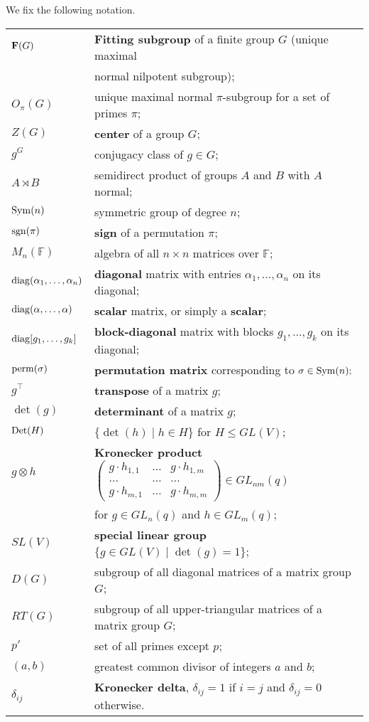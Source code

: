 
We fix the following notation.
\medskip\\
\begin{longtable}{ p{7em} p{27em} }
${\bf F}(G)$ & {\bf Fitting subgroup} \index{Fitting subgroup} of a finite group $G$ (unique maximal \\ & normal  nilpotent subgroup);\\
$O_{\pi}(G)$ & unique maximal normal $\pi$-subgroup for a set of primes $\pi$;\\
$Z(G)$ & {\bf center} of a group $G$;\\
$g^G$ & conjugacy class of $g \in G$;\\
$A \rtimes B$ & semidirect product of groups $A$ and $B$ with $A$ normal;\\
 $\mathrm{Sym}(n)$ &  symmetric group of degree $n$; \\
$\mathrm{sgn}(\pi)$ &  {\bf sign} of a permutation $\pi$;\\
$M_n(\mathbb{F})$& algebra of all $n \times n$ matrices over $\mathbb{F}$;\\
 $\mathrm{diag}(\alpha_1, \ldots, \alpha_n)$ &  {\bf diagonal} matrix with entries $\alpha_1, \ldots, \alpha_n$ on its diagonal;  \\ 
 $\mathrm{diag}(\alpha, \ldots, \alpha)$ &  {\bf scalar} matrix, or simply a {\bf scalar};  \\  
 $\mathrm{diag}[g_1, \ldots, g_k]$ &  {\bf block-diagonal} matrix with blocks $g_1, \ldots, g_k$ on its diagonal;  \\
$\mathrm{perm}(\sigma)$ & {\bf permutation matrix} corresponding to $\sigma \in \mathrm{Sym}(n);$\\
$g^{\top}$ & {\bf transpose} of a matrix $g$;\\
$\det(g)$ &  {\bf determinant} of a matrix $g$;\\
$\mathrm{Det}(H)$ & $\{\det(h) \mid h \in H \}$ for $H \le GL(V)$;\\
$g \otimes h$ &  {\bf Kronecker product} \index{Kronecker product}   
$\begin{pmatrix}
g \cdot h_{1,1}     &  \ldots & g \cdot h_{1,m}  \\
\ldots           &   \ldots   & \ldots   \\
g \cdot h_{m,1}     & \ldots     & g \cdot h_{m,m}      
\end{pmatrix} \in GL_{nm}(q)$ \\ & for $g \in GL_n(q)$ and $h \in GL_m(q)$; \\
$SL(V)$ & {\bf special linear group} $\{g \in GL(V) \mid \det(g)=1\}$;\\
$D(G)$ & subgroup of all diagonal matrices of a matrix group $G$;\\
$RT(G)$ & subgroup of all upper-triangular %
 matrices of a matrix group $G$;\\
$p'$ & set of all primes except $p$;\\
$(a,b)$ & greatest common divisor of integers $a$ and $b$;\\
$\delta_{ij}$ & {\bf Kronecker delta}, $\delta_{ij}=1$ if $i=j$ and $\delta_{ij}=0$ otherwise.
\end{longtable}

